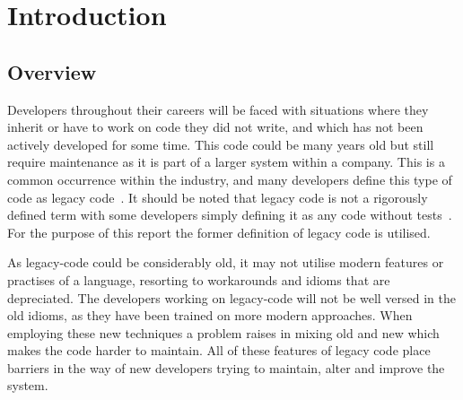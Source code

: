 \documentclass[bsc,frontabs,singlespacing,twoside,parskip,deptreport]{infthesis}
\begin{document}
\chapter{Introduction} \label{Introduction}

\section{Overview}


Developers throughout their careers will be faced with situations where they inherit or have to work on code they did not write, and which has not been actively developed for some time. This code could be many years old but still require maintenance as it is part of a larger system within a company. This is a common occurrence within the industry, and many developers define this type of code as legacy code~\cite{LEGACY_CODE}. It should be noted that legacy code is not a rigorously defined term with some developers simply defining it as any code without tests~\cite{feathers2004working}. For the purpose of this report the former definition of legacy code is utilised. 


As legacy-code could be considerably old, it may not utilise modern features or practises of a language, resorting to workarounds and idioms that are depreciated. The developers working on legacy-code will not be well versed in the old idioms, as they have been trained on more modern approaches. When employing these new techniques a problem raises in mixing old and new which makes the code harder to maintain. All of these features of legacy code place barriers in the way of new developers trying to maintain, alter and improve the system. 
\end{document}
